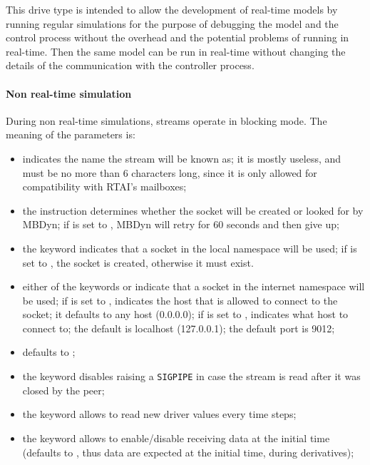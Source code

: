 This drive type is intended to allow the development of real-time models
by running regular simulations for the purpose of debugging the model
and the control process without the overhead and the potential problems
of running in real-time.
Then the same model can be run in real-time without changing the details
of the communication with the controller process.

\paragraph{Non real-time simulation}
During non real-time simulations, streams operate in blocking mode.
The meaning of the parameters is:
\begin{itemize}
\item {} indicates the name the stream will be known as;
it is mostly useless, and must be no more than 6 characters long,
since it is only allowed for compatibility with RTAI's mailboxes;

\item the instruction  determines whether the socket will be
created or looked for by MBDyn; if  is set to ,
MBDyn will retry for 60 seconds and then give up;

\item the keyword  indicates that a socket 
in the local namespace will be used; if  is set to ,
the socket is created, otherwise it must exist.

\item either of the keywords  or  indicate that a socket
in the internet namespace will be used;
if  is set to ,  indicates 
the host that is allowed to connect to the socket; it defaults 
to any host (0.0.0.0); if  is set to ,
 indicates what host to connect to; the default 
is localhost (127.0.0.1); the default port is 9012;

\item {} defaults to ;

\item the keyword  disables raising a \texttt{SIGPIPE}
in case the stream is read after it was closed by the peer;

\item the keyword  allows to read new driver values
every  time steps;

\item the keyword  allows to enable/disable
receiving data at the initial time (defaults to ,
thus data are expected at the initial time, during derivatives);


\end{itemize}
